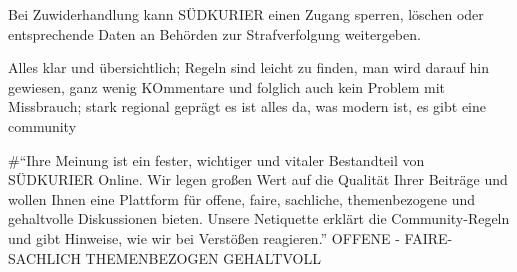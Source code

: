 Bei Zuwiderhandlung kann SÜDKURIER einen Zugang sperren, löschen oder entsprechende Daten an Behörden zur Strafverfolgung weitergeben. 


Alles klar und übersichtlich; Regeln sind leicht zu finden, man wird darauf hin gewiesen, ganz wenig KOmmentare und folglich auch kein Problem mit Missbrauch; stark regional geprägt 
es ist alles da, was modern ist, es gibt eine community

#``Ihre Meinung ist ein fester, wichtiger und vitaler Bestandteil von SÜDKURIER Online. Wir legen großen Wert auf die Qualität Ihrer Beiträge und wollen Ihnen eine Plattform für offene, faire, sachliche, themenbezogene und gehaltvolle Diskussionen bieten. Unsere Netiquette erklärt die Community-Regeln und gibt Hinweise, wie wir bei Verstößen reagieren.'' OFFENE - FAIRE- SACHLICH THEMENBEZOGEN GEHALTVOLL




